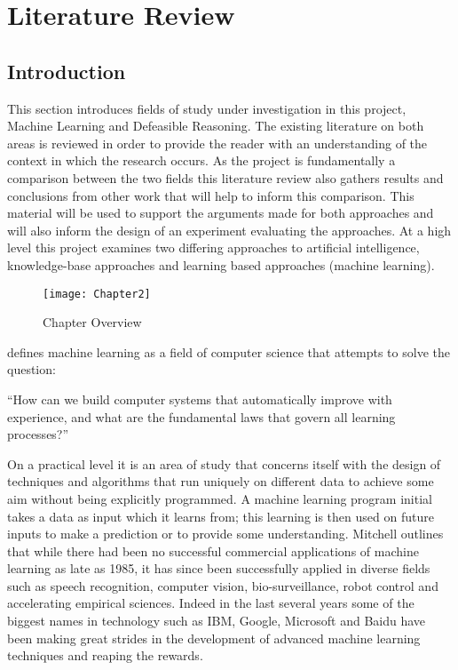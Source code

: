 
\chapter{Literature Review} 

\label{Chapter2} 


\section{Introduction}

This section introduces fields of study under investigation in this project, Machine Learning and Defeasible Reasoning. The existing literature on both areas is reviewed in order to provide the reader with an understanding of the context in which the research occurs. As the project is fundamentally a comparison between the two fields this literature review also gathers results and conclusions from other work that will help to inform this comparison. This material will be used to support the arguments made for both approaches and will also inform the design of an experiment evaluating the approaches. At a high level this project examines two differing approaches to artificial intelligence, knowledge-base approaches and learning based approaches (machine learning).

\begin{figure}[!h]
\centering
\texttt{[image: Chapter2]}
\caption{Chapter Overview}
\label{fig:chapter_overview}
\end{figure}

\cite{mitchell2006discipline} defines machine learning as a field of computer science that attempts to solve the question:

``How can we build computer systems that automatically improve with experience, and what are the fundamental laws that govern all learning processes?''

On a practical level it is an area of study that concerns itself with the design of techniques and algorithms that run uniquely on different data to achieve some aim without being explicitly programmed. A machine learning program initial takes a data as input which it learns from; this learning is then used on future inputs to make a prediction or to provide some understanding. Mitchell outlines that while there had been no successful commercial applications of machine learning as late as 1985, it has since been successfully applied in diverse fields such as speech recognition, computer vision, bio-surveillance, robot control and accelerating empirical sciences. Indeed in the last several years some of the biggest names in technology such as IBM, Google, Microsoft and Baidu have been making great strides in the development of advanced machine learning techniques and reaping the rewards.

